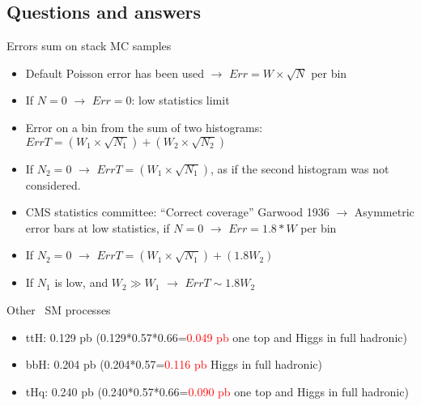 \subsection{Questions and answers}

\begin{frame}{Errors sum on stack MC samples}
\vspace{-.2cm}

\begin{block}{}
  \scriptsize \centering 
  \begin{itemize}
  \item Default Poisson error has been used $\to$ $Err=W\times \sqrt{N}$ per bin
  \item If $N=0$ $\to$ $Err=0$: low statistics limit
  \item Error on a bin from the sum of two histograms: $ErrT=(W_{1}\times \sqrt{N_{1}})+(W_{2}\times \sqrt{N_{2}})$
  \item If $N_{2}=0$ $\to$ $ErrT=(W_{1}\times \sqrt{N_{1}})$, as if the second histogram was not considered.
  \item CMS statistics committee: ``Correct coverage'' Garwood 1936 $\to$ Asymmetric error bars at low statistics, if $N=0$ $\to$ $Err=1.8*W$ per bin
  \item If $N_{2}=0$ $\to$ $ErrT=(W_{1}\times \sqrt{N_{1}})+(1.8W_{2})$
  \item If $N_{1}$ is low, and $W_{2}\gg W_{1}$ $\to$ $ErrT\sim 1.8W_{2}$
  \end{itemize}
\end{block}

\end{frame}

\begin{frame}{Other \Hb~SM processes}
\vspace{-.2cm}

\begin{block}{}
  \scriptsize \centering
  \begin{itemize}
  \item ttH: 0.129 pb (0.129*0.57*0.66=\textcolor{red}{0.049 pb} one top and Higgs in full hadronic)
  \item bbH: 0.204 pb (0.204*0.57=\textcolor{red}{0.116 pb} Higgs in full hadronic)
  \item tHq: 0.240 pb (0.240*0.57*0.66=\textcolor{red}{0.090 pb} one top and Higgs in full hadronic)
  \end{itemize}
\end{block}

\end{frame}

